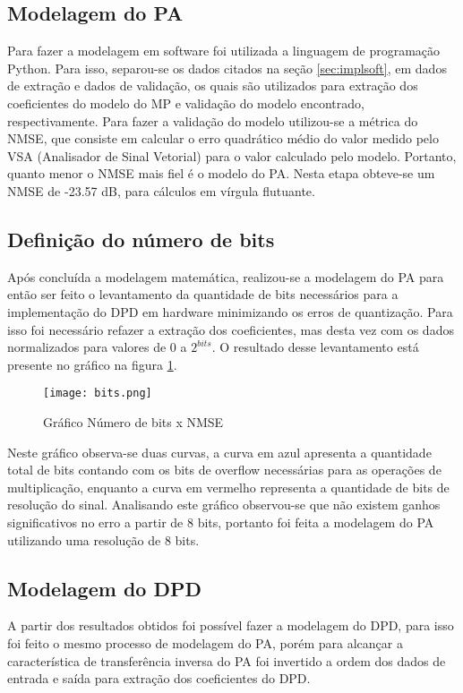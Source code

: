 \subsection{Modelagem do PA}

Para fazer a modelagem em software foi utilizada a linguagem de programação Python. Para isso, separou-se os dados citados na seção \ref{sec:implsoft}, em dados de extração e dados de validação, os quais são utilizados para extração dos coeficientes do modelo do MP e validação do modelo encontrado, respectivamente. Para fazer a validação do modelo utilizou-se a métrica do NMSE, que consiste em calcular o erro quadrático médio do valor medido pelo VSA (Analisador de Sinal Vetorial) para o valor calculado pelo modelo. Portanto, quanto menor o NMSE mais fiel é o modelo do PA. Nesta etapa obteve-se um NMSE de -23.57 dB, para cálculos em vírgula flutuante.

\subsection{Definição do número de bits}

Após concluída a modelagem matemática, realizou-se a modelagem do PA para então ser feito o levantamento da quantidade de bits necessários para a implementação do DPD em hardware minimizando os erros de quantização. 
Para isso foi necessário refazer a extração dos coeficientes, mas desta vez com os dados normalizados para valores de 0 a $2^{bits}$.  
O resultado desse levantamento está presente no gráfico na figura \ref{fig:bits}.

\begin{figure}[htbp]
    \centering
    \captionsetup{justification=centering}
    \texttt{[image: bits.png]}
    \caption{Gráfico Número de bits x NMSE}
    \label{fig:bits}
\end{figure}

Neste gráfico observa-se duas curvas, a curva em azul apresenta a quantidade total de bits contando com os bits de overflow necessárias para as operações de multiplicação, enquanto a curva em vermelho representa a quantidade de bits de resolução do sinal. Analisando este gráfico observou-se que não existem ganhos significativos no erro a partir de 8 bits, portanto foi feita a modelagem do PA utilizando uma resolução de 8 bits. 

\subsection{Modelagem do DPD}
A partir dos resultados obtidos foi possível fazer a modelagem do DPD, para isso foi feito o mesmo processo de modelagem do PA, porém para alcançar a característica de transferência inversa do PA foi invertido a ordem dos dados de entrada e saída para extração dos coeficientes do DPD.

